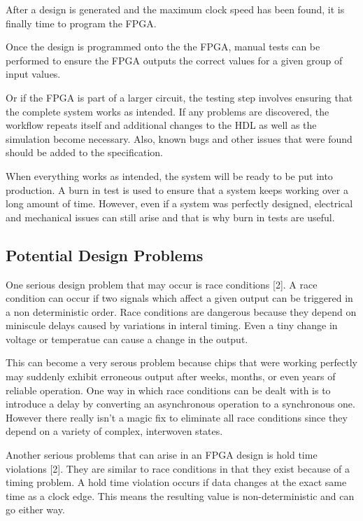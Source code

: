 \documentclass{article}
\begin{document}
    After a design is generated and the maximum clock speed has been found,
    it is finally time to program the FPGA.

    Once the design is programmed onto the the FPGA, manual tests can be performed
    to ensure the FPGA outputs the correct values for a given group of input values.

    Or if the FPGA is part of a larger circuit, the testing step involves ensuring
    that the complete system works as intended. If any problems are discovered,
    the workflow repeats itself and additional changes to the HDL as well as
    the simulation become necessary. Also, known bugs and other issues that were found
    should be added to the specification.

    When everything works as intended, the system will be ready to be put into production.
    A burn in test is used to ensure that a system keeps working over a long amount of time.
    However, even if a system was perfectly designed, electrical and mechanical issues
    can still arise and that is why burn in tests are useful.

    \subsection{Potential Design Problems}

    One serious design problem that may occur is race conditions [2].
    A race condition can occur if two signals which affect a given output
    can be triggered in a non deterministic order. Race conditions are dangerous
    because they depend on miniscule delays caused by variations in interal timing.
    Even a tiny change in voltage or temperatue can cause a change in the output.

    This can become a very serous problem because chips that were working perfectly
    may suddenly exhibit erroneous output after weeks, months, or even years of
    reliable operation. One way in which race conditions can be dealt with
    is to introduce a delay by converting an asynchronous operation to a synchronous one.
    However there really isn't a magic fix to eliminate all race conditions since
    they depend on a variety of complex, interwoven states.

    Another serious problems that can arise in an FPGA design is hold time violations [2].
    They are similar to race conditions in that they exist because of a timing problem.
    A hold time violation occurs if data changes at the exact same time as a clock edge.
    This means the resulting value is non-deterministic and can go either way.
\end{document}
